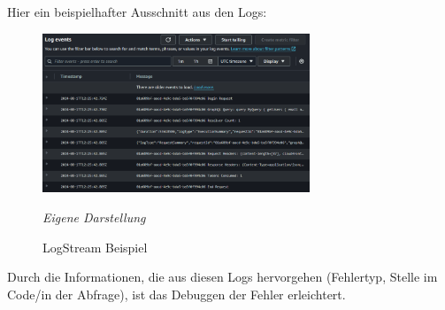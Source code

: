 Hier ein beispielhafter Ausschnitt aus den Logs:
	\begin{figure}[H]
	\centering
	\begin{minipage}[t]{.7\textwidth} %
	\caption{LogStream Beispiel} %
	
	\includegraphics[width = 8cm,keepaspectratio]{logStreamExample} \newline
	
	\textit{Eigene Darstellung} %
	\label{fig:logStreamBeispiel}
	\end{minipage}
	\end{figure}
 
Durch die Informationen, die aus diesen Logs hervorgehen (Fehlertyp, Stelle im Code/in der Abfrage), ist das Debuggen der Fehler erleichtert. 